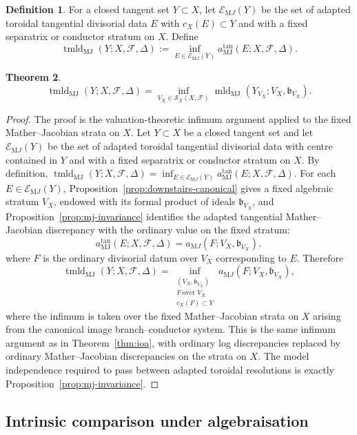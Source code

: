 \documentclass[11pt]{amsart}
\numberwithin{equation}{section}
\theoremstyle{plain}
\newtheorem{Theorem}{Theorem}[section]
\theoremstyle{definition}
\newtheorem{Definition}[Theorem]{Definition}
\newcommand{\mld}{\operatorname{mld}}
\newcommand{\MJ}{\mathrm{MJ}}
\newcommand{\bbound}{\mathfrak b}
\newcommand{\cF}{\mathcal F}
\begin{document}
\begin{Definition}
For a closed tangent set $Y\subset X$, let $\mathcal E_{\mathrm MJ}(Y)$ be the set of adapted toroidal tangential divisorial data $E$ with $c_X(E)\subset Y$ and with a fixed separatrix or conductor stratum on $X$.  Define
\[
\operatorname{tmld}_{\MJ}(Y;X,\cF,\Delta)
:=
\inf_{E\in\mathcal E_{\mathrm MJ}(Y)}
a^{\tan}_{\MJ}(E;X,\cF,\Delta).
\]
\end{Definition}

\begin{Theorem}
\[
\operatorname{tmld}_{\MJ}(Y;X,\cF,\Delta)=
\inf_{V_X\in\mathcal S_X(X,\cF)}\mld_{\MJ}(Y_{V_X};V_X,\bbound_{V_X}).
\]
\end{Theorem}

\begin{proof}
The proof is the valuation-theoretic infimum argument applied to the fixed Mather--Jacobian strata on $X$.
Let \(Y\subset X\) be a closed tangent set and let \(\mathcal E_{\mathrm MJ}(Y)\) be the set of adapted toroidal tangential divisorial data with centre contained in \(Y\) and with a fixed separatrix or conductor stratum on \(X\). By definition,
$
\operatorname{tmld}_{\MJ}(Y;X,\cF,\Delta)
=
\inf_{E\in\mathcal E_{\mathrm MJ}(Y)}
a^{\tan}_{\MJ}(E;X,\cF,\Delta).
$
For each \(E\in\mathcal E_{\mathrm MJ}(Y)\), Proposition~\ref{prop:downstairs-canonical} gives a fixed algebraic stratum \(V_X\), endowed with its formal product of ideals \(\bbound_{V_X}\), and Proposition~\ref{prop:mj-invariance} identifies the adapted tangential Mather--Jacobian discrepancy with the ordinary value on the fixed stratum:
\[
a^{\tan}_{\MJ}(E;X,\cF,\Delta)
=
a_{\mathrm MJ}(F;V_X,\bbound_{V_X}),
\]
where \(F\) is the ordinary divisorial datum over \(V_X\) corresponding to \(E\).
Therefore
\[
\operatorname{tmld}_{\MJ}(Y;X,\cF,\Delta)
=
\inf_{\substack{(V_X,\bbound_{V_X})\\ F\ \text{over }V_X\\ c_X(F)\subset Y}}
a_{\mathrm MJ}(F;V_X,\bbound_{V_X}),
\]
where the infimum is taken over the fixed Mather--Jacobian strata on $X$ arising from the canonical image branch--conductor system.
This is the same infimum argument as in Theorem~\ref{thm:ioa}, with ordinary log discrepancies replaced by ordinary Mather--Jacobian discrepancies on the strata on $X$. The model independence required to pass between adapted toroidal resolutions is exactly Proposition~\ref{prop:mj-invariance}.
\end{proof}

\subsection{Intrinsic comparison under algebraisation}
\label{subsec:intrinsic-mj-algebraisation}
\end{document}
